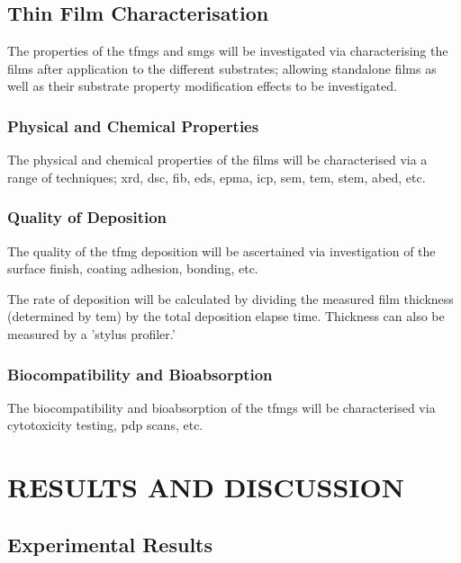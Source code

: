 \documentclass[a4paper,12pt,oneside]{report}%
\begin{document}
\section{Thin Film Characterisation}
The properties of the \glspl{tfmg} and \glspl{smg} will be investigated via characterising the films after application to the different substrates; allowing standalone films as well as their substrate property modification effects to be investigated. 

\subsection{Physical and Chemical Properties}
The physical and chemical properties of the films will be characterised via a range of techniques; \acrshort{xrd}, \acrshort{dsc}, \acrshort{fib}, \acrshort{eds}, \acrshort{epma}, \acrshort{icp}, \acrshort{sem}, \acrshort{tem}, \acrshort{stem}, \acrshort{abed}, etc. 

\subsection{Quality of Deposition} 
The quality of the \gls{tfmg} deposition will be ascertained via investigation of the surface finish, coating adhesion, bonding, etc.

The rate of deposition will be calculated by dividing the measured film thickness (determined by \acrshort{tem}) by the total deposition elapse time. Thickness can also be measured by a 'stylus profiler.'

\subsection{Biocompatibility and Bioabsorption} 
The biocompatibility and bioabsorption of the \glspl{tfmg} will be characterised via cytotoxicity testing, \acrshort{pdp} scans, etc. 


\chapter{RESULTS AND DISCUSSION}
\glsresetall

\section{Experimental Results} 
\end{document}
